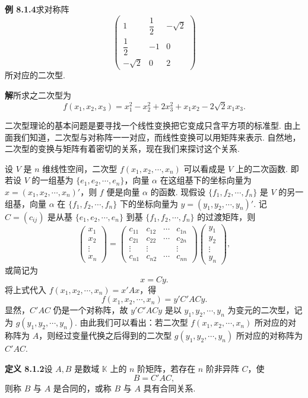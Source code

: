 \documentclass[UTF8,12pt,a4paper,fontset=fandol]{ctexart}
\begin{document}
\noindent\textbf{例 8.1.4}\quad 求对称阵
\[
\left(\begin{array}{ccc}
1&\dfrac12&-\sqrt2\\
\dfrac12&-1&0\\
-\sqrt2&0&2
\end{array}\right)
\]
所对应的二次型.

\noindent\textbf{解}\quad 所求之二次型为
\[
f(x_1,x_2,x_3)=x_1^2-x_2^2+2x_3^2+x_1x_2-2\sqrt2x_1x_3.
\]

二次型理论的基本问题是要寻找一个线性变换把它变成只含平方项的标准型. 由上面我们知道，二次型与对称阵一一对应，而线性变换可以用矩阵来表示. 自然地，二次型的变换与矩阵有着密切的关系，现在我们来探讨这个关系.

设 $V$ 是 $n$ 维线性空间，二次型 $f(x_1,x_2,\cdots,x_n)$ 可以看成是 $V$ 上的二次函数. 即若设 $V$ 的一组基为 $\{e_1,e_2,\cdots,e_n\}$，向量 $\alpha$ 在这组基下的坐标向量为 $x=(x_1,x_2,\cdots,x_n)'$，则 $f$ 便是向量 $\alpha$ 的函数. 现假设 $\{f_1,f_2,\cdots,f_n\}$ 是 $V$ 的另一组基，向量 $\alpha$ 在 $\{f_1,f_2,\cdots,f_n\}$ 下的坐标向量为 $y=(y_1,y_2,\cdots,y_n)'$. 记 $C=(c_{ij})$ 是从基 $\{e_1,e_2,\cdots,e_n\}$ 到基 $\{f_1,f_2,\cdots,f_n\}$ 的过渡矩阵，则
\[
\left(\begin{array}{c}
x_1\\
x_2\\
\vdots\\
x_n
\end{array}\right)
=
\left(\begin{array}{cccc}
c_{11}&c_{12}&\cdots&c_{1n}\\
c_{21}&c_{22}&\cdots&c_{2n}\\
\vdots&\vdots&&\vdots\\
c_{n1}&c_{n2}&\cdots&c_{nn}
\end{array}\right)
\left(\begin{array}{c}
y_1\\
y_2\\
\vdots\\
y_n
\end{array}\right),
\]
或简记为
\[
x=Cy.
\]
将上式代入 $f(x_1,x_2,\cdots,x_n)=x'Ax$，得
\[
f(x_1,x_2,\cdots,x_n)=y'C'ACy.
\]
显然，$C'AC$ 仍是一个对称阵，故 $y'C'ACy$ 是以 $y_1,y_2,\cdots,y_n$ 为变元的二次型，记为 $g(y_1,y_2,\cdots,y_n)$. 由此我们可以看出：若二次型 $f(x_1,x_2,\cdots,x_n)$ 所对应的对称阵为 $A$，则经过变量代换之后得到的二次型 $g(y_1,y_2,\cdots,y_n)$ 所对应的对称阵为 $C'AC$.

\noindent\textbf{定义 8.1.2}\quad 设 $A,B$ 是数域 $\mathbb K$ 上的 $n$ 阶矩阵，若存在 $n$ 阶非异阵 $C$，使
\[
B=C'AC,
\]
则称 $B$ 与 $A$ 是合同的，或称 $B$ 与 $A$ 具有合同关系.
\end{document}
